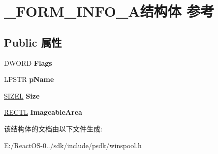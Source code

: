 \hypertarget{struct___f_o_r_m___i_n_f_o__1_a}{}\section{\+\_\+\+F\+O\+R\+M\+\_\+\+I\+N\+F\+O\+\_\+A结构体 参考}
\label{struct___f_o_r_m___i_n_f_o__1_a}
\subsection*{Public 属性}
\begin{DoxyCompactItemize}
\item 
\mbox{\label{struct___f_o_r_m___i_n_f_o__1_a_a379a346d5080c54af530230bf5d06c21}} 
D\+W\+O\+RD {\bfseries Flags}
\item 
\mbox{\label{struct___f_o_r_m___i_n_f_o__1_a_a4e88a64b0d4c202ff1f3efeaf488757a}} 
L\+P\+S\+TR {\bfseries p\+Name}
\item 
\mbox{\label{struct___f_o_r_m___i_n_f_o__1_a_af9d3949d4359fe3aa4334de2a6680c19}} 
\hyperlink{structtag_s_i_z_e}{S\+I\+Z\+EL} {\bfseries Size}
\item 
\mbox{\label{struct___f_o_r_m___i_n_f_o__1_a_ab8d8acbdc32b4770e6cdeaa8aeac839a}} 
\hyperlink{struct___r_e_c_t_l}{R\+E\+C\+TL} {\bfseries Imageable\+Area}
\end{DoxyCompactItemize}


该结构体的文档由以下文件生成\+:\begin{DoxyCompactItemize}
\item 
E\+:/\+React\+O\+S-\/0../sdk/include/psdk/winspool.\+h\end{DoxyCompactItemize}
